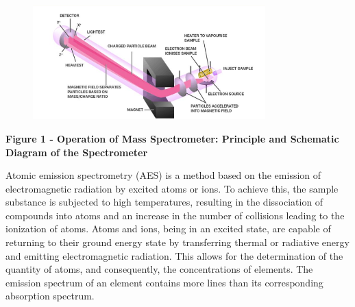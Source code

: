 \begin{figure}[H]
	\centering
	\includegraphics[width=0.8\textwidth]{assets/1049}
	\caption*{}
\end{figure}

\textbf{Figure 1 - Operation of Mass Spectrometer: Principle and
Schematic Diagram of the Spectrometer}

Atomic emission spectrometry (AES) is a method based on the emission of
electromagnetic radiation by excited atoms or ions. To achieve this, the
sample substance is subjected to high temperatures, resulting in the
dissociation of compounds into atoms and an increase in the number of
collisions leading to the ionization of atoms. Atoms and ions, being in
an excited state, are capable of returning to their ground energy state
by transferring thermal or radiative energy and emitting electromagnetic
radiation. This allows for the determination of the quantity of atoms,
and consequently, the concentrations of elements. The emission spectrum
of an element contains more lines than its corresponding absorption
spectrum.

